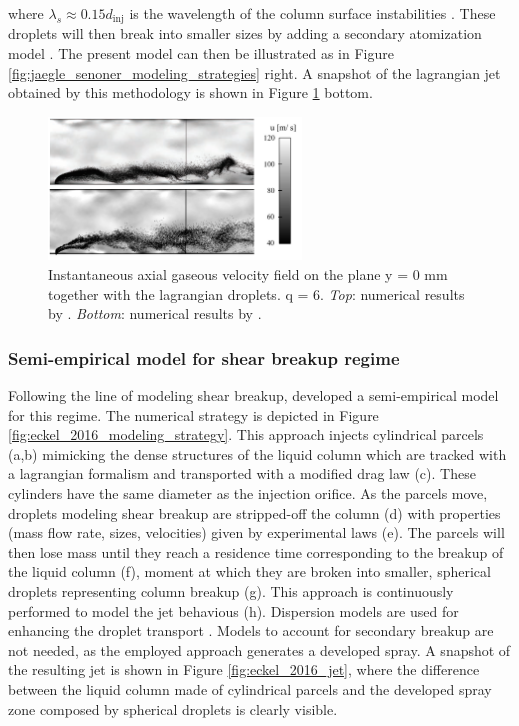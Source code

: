 where $\lambda_s \approx 0.15 d_\mathrm{inj}$ is the wavelength of the column surface instabilities . These droplets will then break into smaller sizes by adding a secondary atomization model . The present model can then be illustrated as in Figure \ref{fig:jaegle_senoner_modeling_strategies} right. A snapshot of the lagrangian jet obtained by this methodology is shown in Figure \ref{fig:jaegle_senoner_lagrangian_fields} bottom.


\begin{figure}[ht]
    \centering
    \includegraphics[width=0.6\textwidth]{./part1_numerical_approaches/figures_ch3/jaegle_senoner_lagrangian_fields}
       \centering
    \caption{Instantaneous axial gaseous velocity field on the plane y = 0 mm together with the lagrangian
droplets. q = 6. \textsl{Top}: numerical results by . \textsl{Bottom}: numerical results by .}
    \label{fig:jaegle_senoner_lagrangian_fields}
\end{figure}

\subsubsection*{Semi-empirical model for shear breakup regime }

Following the line of modeling shear breakup,  developed a semi-empirical model for this regime. The numerical strategy is depicted in Figure \ref{fig:eckel_2016_modeling_strategy}. This approach injects cylindrical parcels (a,b) mimicking the dense structures of the liquid column which are tracked with a lagrangian formalism and transported with a modified drag law (c). These cylinders have the same diameter as the injection orifice.  As the parcels move, droplets modeling shear breakup are stripped-off the column (d) with properties (mass flow rate, sizes, velocities) given by experimental laws (e). The parcels will then lose mass until they reach a residence time corresponding to the breakup of the liquid column (f), moment at which they are broken into smaller, spherical droplets representing column breakup (g). This approach is continuously performed to model the jet behavious (h). Dispersion models are used for enhancing the droplet transport . Models to account for secondary breakup are not needed, as the employed approach generates a developed spray. A snapshot of the resulting jet is shown in Figure \ref{fig:eckel_2016_jet}, where the difference between the liquid column made of cylindrical parcels and the developed spray zone composed by spherical droplets is clearly visible. 

